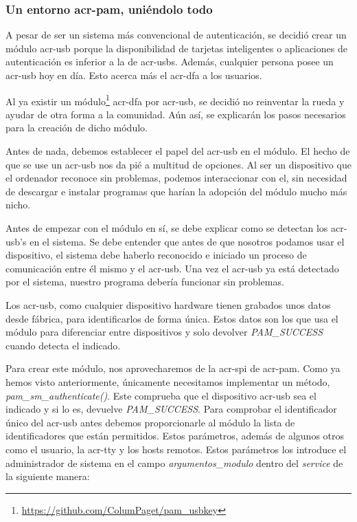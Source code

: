 \documentclass[twoside, titlepage, 12pt, a4paper]{article}
\begin{document}
{\subsubsection{Un entorno \gls{acr-pam}, uniéndolo todo}
A pesar de ser un sistema más convencional de autenticación, se decidió crear un módulo \gls{acr-usb} porque la disponibilidad de tarjetas inteligentes o aplicaciones de autenticación es inferior a la de \gls{acr-usb}s. Además, cualquier persona posee un \gls{acr-usb} hoy en día. Esto acerca más el \gls{acr-dfa} a los usuarios. \par
Al ya existir un módulo\footnote{\url{https://github.com/ColumPaget/pam_usbkey}} \gls{acr-dfa} por \gls{acr-usb}, se decidió no reinventar la rueda y ayudar de otra forma a la comunidad. Aún así, se explicarán los pasos necesarios para la creación de dicho módulo. \par
Antes de nada, debemos establecer el papel del \gls{acr-usb} en el módulo. El hecho de que se use un \gls{acr-usb} nos da pié a multitud de opciones. Al ser un dispositivo que el ordenador reconoce sin problemas, podemos interaccionar con el, sin necesidad de descargar e instalar programas que harían la adopción del módulo mucho más nicho.\par
Antes de empezar con el módulo en sí, se debe explicar como se detectan los \gls{acr-usb}'s en el sistema. Se debe entender que antes de que nosotros podamos usar el dispositivo, el sistema debe haberlo reconocido e iniciado un proceso de comunicación entre él mismo y el \gls{acr-usb}. Una vez el \gls{acr-usb} ya está detectado por el sistema, nuestro programa debería funcionar sin problemas.\par
Los \gls{acr-usb}, como cualquier dispositivo hardware tienen grabados unos datos desde fábrica, para identificarlos de forma única. Estos datos son los que usa el módulo para diferenciar entre dispositivos y solo devolver \textit{PAM\_SUCCESS} cuando detecta el indicado.\par
Para crear este módulo, nos aprovecharemos de la \gls{acr-spi} de \gls{acr-pam}. Como ya hemos visto anteriormente, únicamente necesitamos implementar un método, \textit{pam\_sm\_authenticate()}. Este comprueba que el dispositivo \gls{acr-usb} sea el indicado y si lo es, devuelve \textit{PAM\_SUCCESS}. 
Para comprobar el identificador único del \gls{acr-usb} antes debemos proporcionarle al módulo la lista de identificadores que están permitidos. Estos parámetros, además de algunos otros como el usuario, la \gls{acr-tty} y los hosts remotos. Estos parámetros los introduce el administrador de sistema en el campo \textit{argumentos\_modulo} dentro del \textit{service} de la siguiente manera:
}
\end{document}
